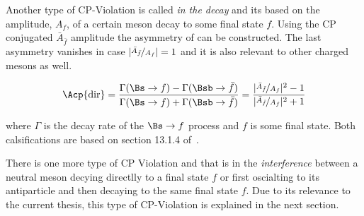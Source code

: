 Another type of CP-Violation is called {\it in the decay} and its based on the amplitude, $A_f$, of a certain meson decay to some final state $f$.
Using the CP conjugated $\bar{A}_{\bar{f}}$ amplitude the asymmetry of  can be constructed.
The last asymmetry vanishes in case $|\nicefrac{\bar{A}_{\bar{f}}}{A_f}| = 1$  and it is also relevant to other charged mesons as well.

\begin{equation}
\Acp{\text{dir}} = \frac{\Gamma(\Bs \rightarrow f) - \Gamma(\Bsb \rightarrow \bar{f})} {\Gamma(\Bs \rightarrow f) + \Gamma(\Bsb \rightarrow \bar{f})}
                = \frac{ |\nicefrac{\bar{A}_{\bar{f}}}{A_f}|^2 - 1}{|\nicefrac{\bar{A}_{\bar{f}}}{A_f}|^2 + 1}
\label{cpv_decay}
\end{equation}

\noindent where $\Gamma$ is the decay rate of the $\Bs \rightarrow f$ process and $f$ is some final state.
Both calsifications are based on section 13.1.4 of~\cite{PDG}.

There is one more type of CP Violation and that is in the {\it interference} between
a neutral meson decying directlly to a final state $f$ or first oscialting to its antiparticle and then decaying
to the same final state $f$. Due to its relevance to the current thesis, this type of CP-Violation is explained
in the next section.
